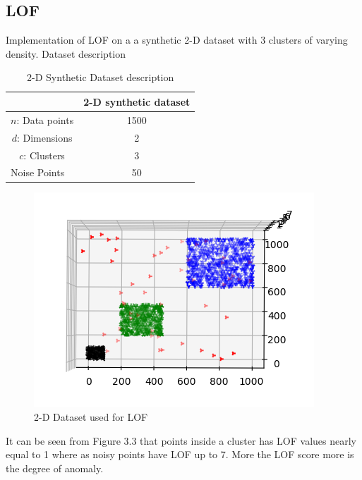 \subsection{LOF}
Implementation of LOF on a 
a synthetic 2-D dataset with 3 clusters of varying density. 
Dataset description\\
\begin{table}[H]
	\centering
	\caption{2-D Synthetic Dataset description}
	\label{my-label}
	\begin{tabular}{|l|l|}
		\hline
		& \multicolumn{1}{c|}{2-D synthetic dataset} \\ \hline
		\multicolumn{1}{|c|}{$n$: Data points} & \multicolumn{1}{c|}{1500}                  \\ \hline
		
		\multicolumn{1}{|c|}{$d$: Dimensions}  & \multicolumn{1}{c|}{2}                     \\ \hline
		\multicolumn{1}{|c|}{$c$: Clusters}  & \multicolumn{1}{c|}{3}                     \\ \hline
		
		
		
		Noise Points                         & \multicolumn{1}{c|}{50}                                         \\ \hline
	\end{tabular}
\end{table}

\begin{figure}[H]
	\centering
	\includegraphics{chap04/LOF_dataset.png}
	\caption{2-D Dataset used for LOF}
\end{figure}

It can be seen from Figure 3.3 that points inside a cluster has LOF values nearly equal to 1 where as noisy points have LOF up to 7. More the LOF score more is the degree of anomaly.

